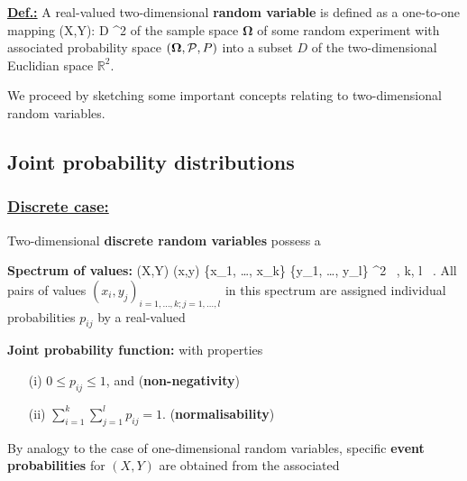 \medskip
\noindent
\underline{\textbf{Def.:}} A real-valued two-dimensional
\textbf{random variable} is defined as a one-to-one mapping
%
\be
\left(X,Y\right): \boldsymbol{\Omega} \rightarrow D \subseteq 
{}^{2}
\ee
%
of the sample space $\boldsymbol{\Omega}$ of some random 
experiment with associated probability space 
$\left(\boldsymbol{\Omega}, {\cal P}, P\right)$ into a subset $D$ 
of the two-dimensional Euclidian space $\mathbb{R}^{2}$.

\medskip
\noindent
We proceed by sketching some important concepts relating to 
two-dimensional random variables.

\subsection[Joint probability distributions]{Joint probability 
distributions}
\subsubsection[Discrete case]{\underline{Discrete case:}}
Two-dimensional \textbf{discrete random variables} possess a

\medskip
\noindent
\textbf{Spectrum of values:}
%
\be
(X,Y) \mapsto (x,y) \in \left\{x_{1}, \ldots, x_{k}\right\} \times
\left\{y_{1}, \ldots, y_{l}\right\}
\subset {}^{2} \ ,
\quad\quad{}\quad k, l \in {} \ .
\ee
%
All pairs of values $(x_{i},y_{j})_{i=1,\ldots,k; j=1,\ldots,l}$ 
in this spectrum are assigned individual probabilities $p_{ij}$ by 
a real-valued

\medskip
\noindent
\textbf{Joint probability function:}
%
\be
{}
\ee
%
with properties\\[-5mm]
%
\begin{center}
\begin{itemize}
\item[(i)] $0 \leq p_{ij} \leq 1$, and
\hfill (\textbf{non-negativity})\\[-5mm]

\item[(ii)] ${\displaystyle\sum_{i=1}^{k}\sum_{j=1}^{l}p_{ij}=1}$.
\hfill (\textbf{normalisability})\\[-5mm]
\end{itemize}
\end{center}
%
By analogy to the case of one-dimensional random variables, 
specific \textbf{event probabilities} for $(X,Y)$ are obtained from 
the associated

